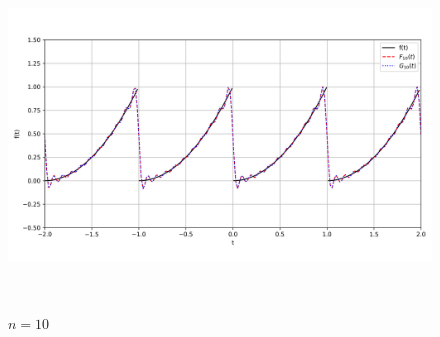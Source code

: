 \documentclass[a4paper]{article}
\begin{document}
\begin{figure}[H]
\begin{minipage}{0.5\textwidth}
        \caption{$n = 5$}
    \end{minipage}\hfill
    \begin{minipage}{0.5\textwidth}
        \centering \includegraphics[width=\textwidth]{periodic_func/10.png}
        \caption{$n = 10$}
    \end{minipage}\\[2em]
\end{figure}
\end{document}
